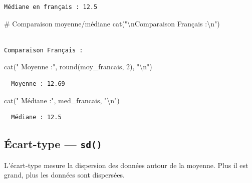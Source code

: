 \documentclass[
  french,
  11pt,
  a4paper,
]{article}
\newenvironment{Shaded}{}{}
\newcommand{\CommentTok}[1]{\textcolor[rgb]{0.42,0.45,0.49}{#1}}
\newcommand{\DecValTok}[1]{\textcolor[rgb]{0.00,0.36,0.77}{#1}}
\newcommand{\FunctionTok}[1]{\textcolor[rgb]{0.44,0.26,0.76}{#1}}
\newcommand{\NormalTok}[1]{\textcolor[rgb]{0.14,0.16,0.18}{#1}}
\newcommand{\SpecialCharTok}[1]{\textcolor[rgb]{0.00,0.36,0.77}{#1}}
\newcommand{\StringTok}[1]{\textcolor[rgb]{0.01,0.18,0.38}{#1}}
\begin{document}
\begin{verbatim}
Médiane en français : 12.5 
\end{verbatim}

\begin{Shaded}
\begin{Highlighting}[]
\CommentTok{\# Comparaison moyenne/médiane}
\FunctionTok{cat}\NormalTok{(}\StringTok{"}\SpecialCharTok{\textbackslash{}n}\StringTok{Comparaison Français :}\SpecialCharTok{\textbackslash{}n}\StringTok{"}\NormalTok{)}
\end{Highlighting}
\end{Shaded}

\begin{verbatim}

Comparaison Français :
\end{verbatim}

\begin{Shaded}
\begin{Highlighting}[]
\FunctionTok{cat}\NormalTok{(}\StringTok{"  Moyenne :"}\NormalTok{, }\FunctionTok{round}\NormalTok{(moy\_francais, }\DecValTok{2}\NormalTok{), }\StringTok{"}\SpecialCharTok{\textbackslash{}n}\StringTok{"}\NormalTok{)}
\end{Highlighting}
\end{Shaded}

\begin{verbatim}
  Moyenne : 12.69 
\end{verbatim}

\begin{Shaded}
\begin{Highlighting}[]
\FunctionTok{cat}\NormalTok{(}\StringTok{"  Médiane :"}\NormalTok{, med\_francais, }\StringTok{"}\SpecialCharTok{\textbackslash{}n}\StringTok{"}\NormalTok{)}
\end{Highlighting}
\end{Shaded}

\begin{verbatim}
  Médiane : 12.5 
\end{verbatim}

\subsection{\texorpdfstring{Écart-type ---
\texttt{sd()}}{Écart-type --- sd()}}\label{uxe9cart-type-sd}

L'écart-type mesure la dispersion des données autour de la moyenne. Plus
il est grand, plus les données sont dispersées.
\end{document}
